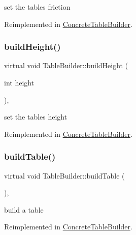 set the table\textquotesingle{}s friction 

Reimplemented in \mbox{\hyperlink{class_concrete_table_builder_aab2c2ff234def292f7ead072dd5fda60}{Concrete\+Table\+Builder}}.

\mbox{\label{class_table_builder_ad3e3bb11cd8f9eecd49ad6012e358d05}} 
\subsubsection{\texorpdfstring{build\+Height()}{buildHeight()}}
{\footnotesize\ttfamily virtual void Table\+Builder\+::build\+Height (\begin{DoxyParamCaption}\item[{int}]{height }\end{DoxyParamCaption})\hspace{0.3cm}{\ttfamily [inline]}, {\ttfamily [virtual]}}

set the table\textquotesingle{}s height 

Reimplemented in \mbox{\hyperlink{class_concrete_table_builder_a3e72d6d46e47146e385fff3937718a13}{Concrete\+Table\+Builder}}.

\mbox{\label{class_table_builder_a4aba0952fb1912f9ff7ca4cfb3085dd9}} 
\subsubsection{\texorpdfstring{build\+Table()}{buildTable()}}
{\footnotesize\ttfamily virtual void Table\+Builder\+::build\+Table (\begin{DoxyParamCaption}{ }\end{DoxyParamCaption})\hspace{0.3cm}{\ttfamily [inline]}, {\ttfamily [virtual]}}

build a table 

Reimplemented in \mbox{\hyperlink{class_concrete_table_builder_af49b5e371e6f725303e4b2f011d20fad}{Concrete\+Table\+Builder}}.

\mbox{\label{class_table_builder_a4269a0b8c10cf6fcae0c8525bdb08ff0}} 
